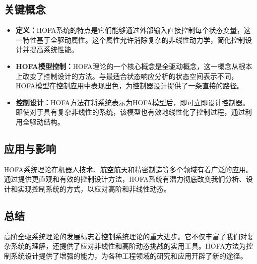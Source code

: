 \subsection*{关键概念}

\begin{itemize}
    \item \textbf{定义：}HOFA系统的特点是它们能够通过外部输入直接控制每个状态变量，这一特性基于全驱动属性。这个属性允许消除复杂的非线性动力学，简化控制设计并提高系统性能。
    
    \item \textbf{HOFA模型控制：}HOFA理论的一个核心概念是全驱动概念，这一概念从根本上改变了控制设计的方法。与最适合状态响应分析的状态空间表示不同，HOFA模型在控制应用中表现出色，为控制器设计提供了一条直接的路径。
    
    \item \textbf{控制设计：}HOFA方法在将系统表示为HOFA模型后，即可立即设计控制器。即使对于具有复杂非线性的系统，该模型也有效地线性化了控制过程，通过利用全驱动结构。
\end{itemize}

\subsection*{应用与影响}

HOFA系统理论在机器人技术、航空航天和精密制造等多个领域有着广泛的应用。通过提供更直观和有效的控制设计方法，HOFA系统有潜力彻底改变我们分析、设计和实现控制系统的方式，以应对高阶和非线性动态。

\subsection*{总结}

高阶全驱系统理论的发展标志着控制系统理论的重大进步。它不仅丰富了我们对复杂系统的理解，还提供了应对非线性和高阶动态挑战的实用工具。HOFA方法为控制系统设计提供了增强的能力，为各种工程领域的研究和应用开辟了新的途径。


